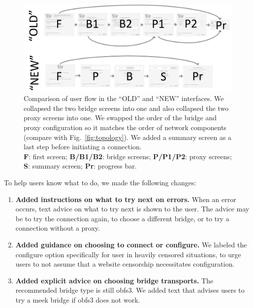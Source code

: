 \documentclass[USenglish,oneside,twocolumn]{article}
\begin{document}
 \label{redesign}
\begin{figure}[t]
\centering
\includegraphics[width=.85\textwidth]{old-and-new-flows.png}
\caption{
Comparison of user flow in the ``OLD'' and ``NEW'' interfaces.
We collapsed the two bridge screens into one 
and also collapsed the two proxy screens into one.
We swapped the order of the bridge and proxy configuration
so it matches the order of network components (compare with Fig.~\ref{fig:topology}).
We added a summary screen as a last step before initiating a connection.\\
\textbf{F}: first screen;
\textbf{B/B1/B2}: bridge screens;
\textbf{P/P1/P2}: proxy screens;
\textbf{S}: summary screen;
\textbf{Pr}: progress bar.
}
\label{fig:flow}
\end{figure} 

To help users know what to do, we made the following changes:\\

\begin{enumerate}
\item {\bfseries Added instructions on what to try next on errors.} When an error occurs, text advice on what to try next is shown to the user. The advice may be to try the connection again, to choose a different bridge, or to try a connection without a proxy. 
\item {\bfseries Added guidance on choosing to connect or configure.} We labeled the configure option specifically for user in heavily censored situations, to urge users to not assume that a website censorship necessitates configuration.
\item {\bfseries Added explicit advice on choosing bridge transports.} The recommended bridge type is still obfs3. We added text that advises users to try a meek bridge if obfs3 does not work. 
\end{enumerate} 
\end{document}
